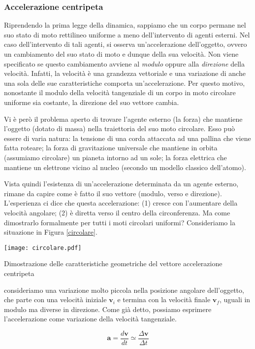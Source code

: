 \subsubsection*{Accelerazione centripeta}
Riprendendo la prima legge della dinamica, sappiamo che un corpo permane nel
suo stato di moto rettilineo uniforme a meno dell'intervento di agenti esterni.
Nel caso dell'intervento di tali agenti, si osserva un'accelerazione
dell'oggetto, ovvero un cambiamento del suo stato di moto e dunque della sua
velocità. Non viene specificato se questo cambiamento avviene al \textit{modulo}
oppure alla \textit{direzione} della velocità. Infatti, la velocità è una
grandezza vettoriale e una variazione di anche una sola delle sue caratteristiche
comporta un'accelerazione. Per questo motivo, nonostante il modulo della velocità
tangenziale di un corpo in moto circolare uniforme sia costante, la direzione
del suo vettore cambia.

Vi è però il problema aperto di trovare l'agente esterno (la forza) che
mantiene l'oggetto (dotato di massa) nella traiettoria del suo moto circolare.
Esso può essere di varia natura: la tensione di una corda attaccata ad una
pallina che viene fatta roteare; la forza di gravitazione universale che
mantiene in orbita (assumiamo circolare) un pianeta intorno ad un sole; la forza
elettrica che mantiene un elettrone vicino al nucleo (secondo un modello classico
dell'atomo).

Vista quindi l'esistenza di un'accelerazione determinata da un agente esterno,
rimane da capire come è fatto il suo vettore (modulo, verso e direzione).
L'esperienza ci dice che questa accelerazione: (1) cresce con l'aumentare della
velocità angolare; (2) è diretta verso il centro della circonferenza. Ma come
dimostrarlo formalmente per tutti i moti circolari uniformi? Consideriamo la
situazione in Figura \ref{circolare}.
\begin{marginfigure}
    \centering
    \texttt{[image: circolare.pdf]}
    \caption{Dimostrazione delle caratteristiche geometriche del vettore accelerazione centripeta}
    \label{circolare}
\end{marginfigure}
consideriamo una variazione molto piccola nella posizione angolare dell'oggetto,
che parte con una velocità iniziale $\mathbf{v}_i$ e termina con la
velocità finale $\mathbf{v}_f$, uguali in modulo ma diverse in direzione.
Come già detto, possiamo esprimere l'accelerazione come variazione della
velocità tangenziale.

\[ \mathbf{a} = \frac{d\mathbf{v}}{dt} \simeq \frac{\Delta\mathbf{v}}{\Delta t} \]

